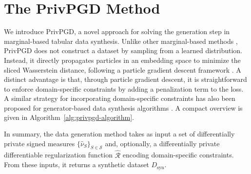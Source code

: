 \section{The PrivPGD Method}

We introduce PrivPGD, a novel approach for solving the generation step in marginal-based tabular data synthesis. Unlike other marginal-based methods \citep{zhang2017privbayes,mckenna2019graphical}, PrivPGD does not construct a dataset by sampling from a learned distribution. Instead, it directly propagates particles in an embedding space to minimize the sliced Wasserstein distance, following a particle gradient descent framework \citep{chizat2018global,chizat2022sparse}. A distinct advantage is that, through particle gradient descent, it is straightforward to enforce domain-specific constraints by adding a penalization term to the loss. A similar strategy for incorporating domain-specific constraints has also been proposed for generator-based data synthesis algorithms \citep{vero2023programmable}. A compact overview is given in Algorithm~\ref{alg:privpgd-algorithm}.


In summary, the data generation method takes as input a set of differentially private signed measures \(\{\hat{\nu}_S\}_{S \in \mathcal{S}}\) and, optionally, a differentially private differentiable regularization function \(\hat{\mathcal{R}}\) encoding domain-specific constraints. From these inputs, it returns a synthetic dataset \(D_{\mathrm{syn}}\).

